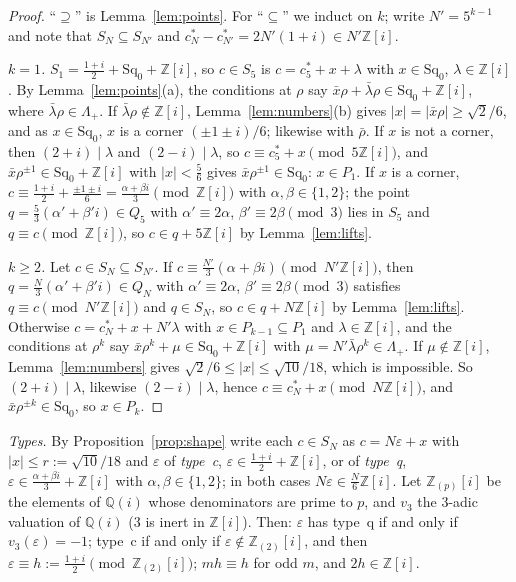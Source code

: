\documentclass[11pt,a4paper]{amsart}
\theoremstyle{remark}
\newcommand{\Q}{\mathbb{Q}}
\newcommand{\Z}{\mathbb{Z}}
\newcommand{\Sq}{\mathrm{Sq}}
\begin{document}
\begin{proof}
``$\supseteq$'' is Lemma~\ref{lem:points}. For ``$\subseteq$'' we induct on $k$; write $N'=5^{k-1}$ and note that
$S_N\subseteq S_{N'}$ and $c^*_N-c^*_{N'}=2N'(1+i)\in N'\Z[i]$.

\emph{$k=1$.} $S_1=\frac{1+i}2+\Sq_0+\Z[i]$, so $c\in S_5$ is $c=c^*_5+x+\lambda$ with $x\in\Sq_0$, $\lambda\in\Z[i]$.
By Lemma~\ref{lem:points}(a), the conditions at $\rho$ say $\bar x\rho+\bar\lambda\rho\in\Sq_0+\Z[i]$, where
$\bar\lambda\rho\in\Lambda_+$. If $\bar\lambda\rho\notin\Z[i]$, Lemma~\ref{lem:numbers}(b) gives
$|x|=|\bar x\rho|\ge\sqrt2/6$, and as $x\in\Sq_0$, $x$ is a corner $(\pm1\pm i)/6$; likewise with $\bar\rho$. If $x$
is not a corner, then $(2+i)\mid\lambda$ and $(2-i)\mid\lambda$, so $c\equiv c^*_5+x\pmod{5\Z[i]}$, and
$\bar x\rho^{\pm1}\in\Sq_0+\Z[i]$ with $|x|<\frac56$ gives $\bar x\rho^{\pm1}\in\Sq_0$: $x\in P_1$. If $x$ is a
corner, $c\equiv\frac{1+i}2+\frac{\pm1\pm i}6=\frac{\alpha+\beta i}3\pmod{\Z[i]}$ with $\alpha,\beta\in\{1,2\}$; the
point $q=\frac53(\alpha'+\beta'i)\in Q_5$ with $\alpha'\equiv2\alpha$, $\beta'\equiv2\beta\pmod3$ lies in $S_5$ and
$q\equiv c\pmod{\Z[i]}$, so $c\in q+5\Z[i]$ by Lemma~\ref{lem:lifts}.

\emph{$k\ge2$.} Let $c\in S_N\subseteq S_{N'}$. If $c\equiv\frac{N'}3(\alpha+\beta i)\pmod{N'\Z[i]}$, then
$q=\frac N3(\alpha'+\beta'i)\in Q_N$ with $\alpha'\equiv2\alpha$, $\beta'\equiv2\beta\pmod3$ satisfies
$q\equiv c\pmod{N'\Z[i]}$ and $q\in S_N$, so $c\in q+N\Z[i]$ by Lemma~\ref{lem:lifts}. Otherwise
$c=c^*_N+x+N'\lambda$ with $x\in P_{k-1}\subseteq P_1$ and $\lambda\in\Z[i]$, and the conditions at $\rho^k$ say
$\bar x\rho^k+\mu\in\Sq_0+\Z[i]$ with $\mu=N'\bar\lambda\rho^k\in\Lambda_+$. If $\mu\notin\Z[i]$,
Lemma~\ref{lem:numbers} gives $\sqrt2/6\le|x|\le\sqrt{10}/18$, which is impossible. So $(2+i)\mid\lambda$, likewise
$(2-i)\mid\lambda$, hence $c\equiv c^*_N+x\pmod{N\Z[i]}$, and $\bar x\rho^{\pm k}\in\Sq_0$, so $x\in P_k$.
\end{proof}

\emph{Types.} By Proposition~\ref{prop:shape} write each $c\in S_N$ as $c=N\varepsilon+x$ with
$|x|\le r:=\sqrt{10}/18$ and $\varepsilon$ of \emph{type~c}, $\varepsilon\in\frac{1+i}2+\Z[i]$, or of \emph{type~q},
$\varepsilon\in\frac{\alpha+\beta i}3+\Z[i]$ with $\alpha,\beta\in\{1,2\}$; in both cases
$N\varepsilon\in\frac N6\Z[i]$. Let $\Z_{(p)}[i]$ be the elements of $\Q(i)$ whose denominators are prime to $p$,
and $v_3$ the $3$-adic valuation of $\Q(i)$ ($3$ is inert in $\Z[i]$). Then: $\varepsilon$ has type~q if and only
if $v_3(\varepsilon)=-1$; type~c if and only if $\varepsilon\notin\Z_{(2)}[i]$, and then
$\varepsilon\equiv h:=\frac{1+i}2\pmod{\Z_{(2)}[i]}$; $mh\equiv h$ for odd $m$, and $2h\in\Z[i]$.
\end{document}
